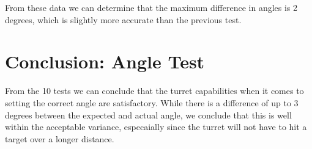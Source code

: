 
From these data we can determine that the maximum difference in angles is 2
degrees, which is slightly more accurate than the previous test.

\section{Conclusion: Angle Test}
From the 10 tests we can conclude that the turret capabilities when it comes to
setting the correct angle are satisfactory. While there is a difference of up to
3 degrees between the expected and actual angle, we conclude that this is well
within the acceptable variance, especaially since the turret will not have to
hit a target over a longer distance.   
